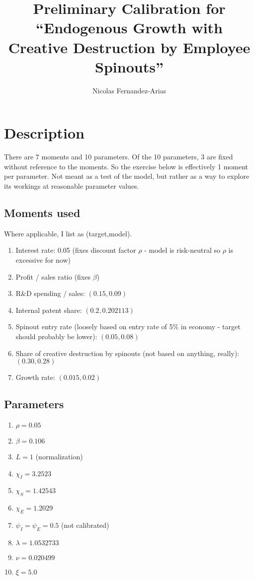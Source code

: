 \documentclass[11pt,english]{article}
\theoremstyle{remark}
\begin{document}
	
\title{Preliminary Calibration for ``Endogenous Growth with Creative Destruction by Employee Spinouts''}
\author{Nicolas Fernandez-Arias}
\maketitle

\section{Description}

There are 7 moments and 10 parameters. Of the 10 parameters, 3 are fixed without reference to the moments. So the exercise below is effectively 1 moment per parameter. Not meant as a test of the model, but rather as a way to explore its workings at reasonable parameter values.

\subsection{Moments used}

Where applicable, I list as (target,model).

\begin{enumerate}
	\item Interest rate: 0.05 (fixes discount factor $\rho$ - model is risk-neutral so $\rho$ is excessive for now)
	\item Profit / sales ratio (fixes $\beta$)
	\item R\&D spending / sales: $(0.15,0.09)$
	\item Internal patent share: $(0.2,0.202113)$
	\item Spinout entry rate (loosely based on entry rate of 5\% in economy - target should probably be lower): $(0.05,0.08)$
	\item Share of creative destruction by spinouts (not based on anything, really): $(0.30,0.28)$
	\item Growth rate: $(0.015, 0.02)$
\end{enumerate}

\subsection{Parameters}
\begin{enumerate}
	\item $\rho = 0.05$
	\item $\beta = 0.106$
	\item $L = 1$ (normalization)
	\item $\chi_I = 3.2523$
	\item $\chi_S = 1.42543$
	\item $\chi_E = 1.2029$
	\item $\psi_I = \psi_E = 0.5$ (not calibrated)
	\item $\lambda = 1.0532733$
	\item $\nu = 0.020499$
	\item $\xi = 5.0$
\end{enumerate}
\end{document}
